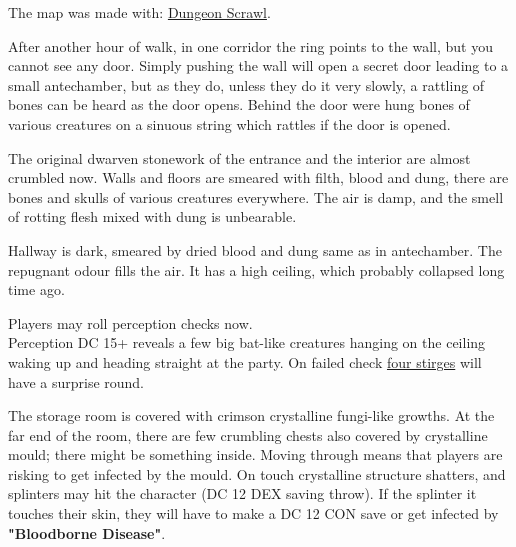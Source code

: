 \documentclass[10pt,onecolumn,twoside,openany,bg=full,layout=true]{dndbook}
\begin{document}
The map was made with: \href{https://probabletrain.itch.io/dungeon-scrawl}{Dungeon Scrawl}.

After another hour of walk, in one corridor the ring points to the wall, but you cannot see any door.
Simply pushing the wall will open a secret door leading to a small antechamber, but as they do,
unless they do it very slowly, a rattling of bones can be heard as the door opens.
Behind the door were hung bones of various creatures on a sinuous string which rattles if the door is opened.
\vfill
\newpage

The original dwarven stonework of the entrance and the interior are almost crumbled now.
Walls and floors are smeared with filth, blood and dung, there are bones and skulls of various creatures everywhere.
The air is damp, and the smell of rotting flesh mixed with dung is unbearable.

Hallway is dark, smeared by dried blood and dung same as in antechamber.
The repugnant odour fills the air.
It has a high ceiling, which probably collapsed long time ago.

Players may roll perception checks now. \\
Perception DC 15+ reveals a few big bat-like creatures hanging on the ceiling waking up and heading straight at the party.
On failed check \href{https://www.dndbeyond.com/monsters/17023-stirge}{four stirges} will have a surprise round.

The storage room is covered with crimson crystalline fungi-like growths.
At the far end of the room, there are few crumbling chests also covered by crystalline mould; there might be something inside.
Moving through means that players are risking to get infected by the mould.
On touch crystalline structure shatters, and splinters may hit the character (DC 12 DEX saving throw).
If the splinter it touches their skin, they will have to make a DC 12 CON save or get infected by \textbf{"Bloodborne Disease"}.
\end{document}
